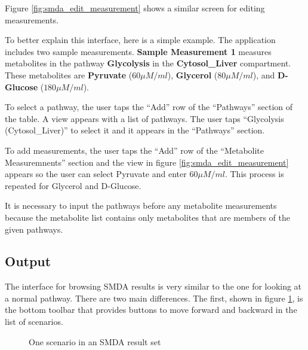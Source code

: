 Figure \ref{fig:smda_edit_measurement} shows a similar screen for editing
measurements.

To better explain this interface, here is a simple example. The application
includes two sample measurements. \textbf{Sample Measurement 1} measures
metabolites in the pathway \textbf{Glycolysis} in the \textbf{Cytosol\_Liver}
compartment. These metabolites are \textbf{Pyruvate} ($60 \mu M/ml$),
\textbf{Glycerol} ($80 \mu M/ml$), and \textbf{D-Glucose} ($180 \mu M/ml$).

To select a pathway, the user taps the ``Add'' row of the ``Pathways'' section
of the table. A view appears with a list of pathways. The user taps ``Glycolysis
(Cytosol\_Liver)'' to select it and it appears in the ``Pathways'' section.

To add measurements, the user taps the ``Add'' row of the ``Metabolite
Measuremnents'' section and the view in figure \ref{fig:smda_edit_measurement}
appears so the user can select Pyruvate and enter $60 \mu M/ml$. This process is
repeated for Glycerol and D-Glucose.

It is necessary to input the pathways before any metabolite measurements because
the metabolite list contains only metabolites that are members of the given
pathways.

\subsection{Output}
\label{sect:smda_interface_output}

The interface for browsing SMDA results is very similar to the one for looking
at a normal pathway. There are two main differences. The first, shown in figure
\ref{fig:smda_results}, is the bottom toolbar that provides buttons to move
forward and backward in the list of scenarios.

\begin{figure}[htb]
    \caption{\label{fig:smda_results} One scenario in an SMDA result set}
\end{figure}

